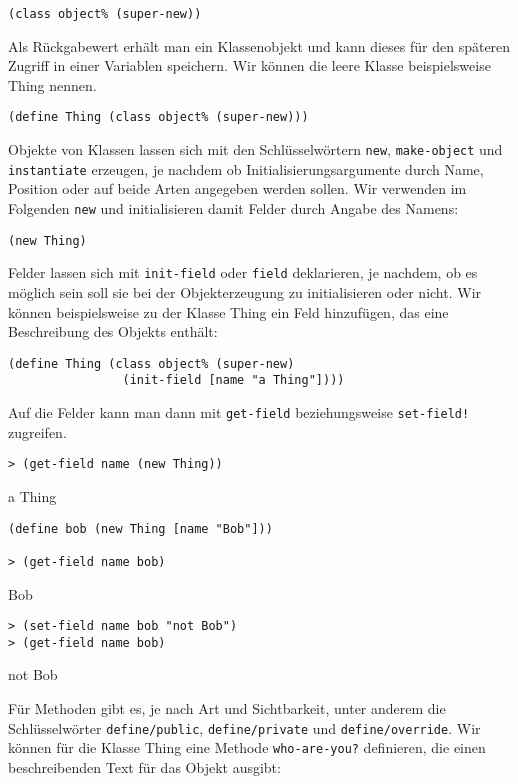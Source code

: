 \begin{lstlisting}
(class object% (super-new))
\end{lstlisting}

Als Rückgabewert erhält man ein Klassenobjekt und kann dieses für den späteren Zugriff in einer Variablen speichern. Wir können die leere Klasse beispielsweise Thing nennen.

\begin{lstlisting}
(define Thing (class object% (super-new)))
\end{lstlisting}

Objekte von Klassen lassen sich mit den Schlüsselwörtern \texttt{new}, \texttt{make-object} und \texttt{instantiate} erzeugen, je nachdem ob Initialisierungsargumente durch Name, Position oder auf beide Arten angegeben werden sollen. Wir verwenden im Folgenden \texttt{new} und initialisieren damit Felder durch Angabe des Namens:

\begin{lstlisting}
(new Thing)
\end{lstlisting}

Felder lassen sich mit \texttt{init-field} oder \texttt{field} deklarieren, je nachdem, ob es möglich sein soll sie bei der Objekterzeugung zu initialisieren oder nicht. Wir können beispielsweise zu der Klasse Thing ein Feld hinzufügen, das eine Beschreibung des Objekts enthält:

\begin{lstlisting}
(define Thing (class object% (super-new)
                (init-field [name "a Thing"])))
\end{lstlisting}

Auf die Felder kann man dann mit \texttt{get-field} beziehungsweise \texttt{set-field!} zugreifen. 

\begin{lstlisting}
> (get-field name (new Thing))
\end{lstlisting}
{\routput {\qq}a Thing{\qq}}

\begin{lstlisting}
(define bob (new Thing [name "Bob"]))

> (get-field name bob)
\end{lstlisting}
{\routput {\qq}Bob{\qq}}

\begin{lstlisting}
> (set-field name bob "not Bob")
> (get-field name bob)
\end{lstlisting}
{\routput {\qq}not Bob{\qq}}

Für Methoden gibt es, je nach Art und Sichtbarkeit, unter anderem die Schlüsselwörter \texttt{define/public}, \texttt{define/private} und \texttt{define/override}. Wir können für die Klasse Thing eine Methode \texttt{who-are-you?} definieren, die einen beschreibenden Text für das Objekt ausgibt:

